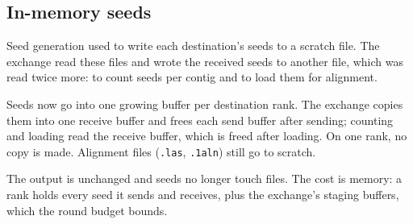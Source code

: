 \subsection{In-memory seeds}\label{sec:impl:o4}
Seed generation used to write each destination's seeds to a scratch file.
The exchange read these files and wrote the received seeds to another file,
which was read twice more: to count seeds per contig and to load them for
alignment.

Seeds now go into one growing buffer per destination rank. The exchange
copies them into one receive buffer and frees each send buffer after
sending; counting and loading read the receive buffer, which is freed after
loading. On one rank, no copy is made. Alignment files (\texttt{.las},
\texttt{.1aln}) still go to scratch.

The output is unchanged and seeds no longer touch files. The cost is
memory: a rank holds every seed it sends and receives, plus the exchange's
staging buffers, which the round budget bounds.
